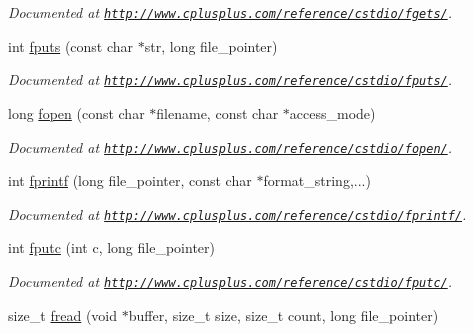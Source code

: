 \begin{DoxyCompactItemize}
\begin{DoxyCompactList}\small\item\em Documented at \href{http://www.cplusplus.com/reference/cstdio/fgets/}{\tt http\-://www.\-cplusplus.\-com/reference/cstdio/fgets/}. \end{DoxyCompactList}\item 
\hypertarget{group__file_gaf7529a4ebfea114f18c84860c6e9e04c}{int \hyperlink{group__file_gaf7529a4ebfea114f18c84860c6e9e04c}{fputs} (const char $\ast$str, long file\-\_\-pointer)}\label{group__file_gaf7529a4ebfea114f18c84860c6e9e04c}

\begin{DoxyCompactList}\small\item\em Documented at \href{http://www.cplusplus.com/reference/cstdio/fputs/}{\tt http\-://www.\-cplusplus.\-com/reference/cstdio/fputs/}. \end{DoxyCompactList}\item 
\hypertarget{group__file_gacb39e7f103a086acfd6add72c1b362c0}{long \hyperlink{group__file_gacb39e7f103a086acfd6add72c1b362c0}{fopen} (const char $\ast$filename, const char $\ast$access\-\_\-mode)}\label{group__file_gacb39e7f103a086acfd6add72c1b362c0}

\begin{DoxyCompactList}\small\item\em Documented at \href{http://www.cplusplus.com/reference/cstdio/fopen/}{\tt http\-://www.\-cplusplus.\-com/reference/cstdio/fopen/}. \end{DoxyCompactList}\item 
\hypertarget{group__file_gaee12141810555c53258443f8ff929b1f}{int \hyperlink{group__file_gaee12141810555c53258443f8ff929b1f}{fprintf} (long file\-\_\-pointer, const char $\ast$format\-\_\-string,...)}\label{group__file_gaee12141810555c53258443f8ff929b1f}

\begin{DoxyCompactList}\small\item\em Documented at \href{http://www.cplusplus.com/reference/cstdio/fprintf/}{\tt http\-://www.\-cplusplus.\-com/reference/cstdio/fprintf/}. \end{DoxyCompactList}\item 
\hypertarget{group__file_ga78f482be08e44554b059b574c4b63d0d}{int \hyperlink{group__file_ga78f482be08e44554b059b574c4b63d0d}{fputc} (int c, long file\-\_\-pointer)}\label{group__file_ga78f482be08e44554b059b574c4b63d0d}

\begin{DoxyCompactList}\small\item\em Documented at \href{http://www.cplusplus.com/reference/cstdio/fputc/}{\tt http\-://www.\-cplusplus.\-com/reference/cstdio/fputc/}. \end{DoxyCompactList}\item 
\hypertarget{group__file_ga3b86a6bb8423253b0089888caafb13b8}{size\-\_\-t \hyperlink{group__file_ga3b86a6bb8423253b0089888caafb13b8}{fread} (void $\ast$buffer, size\-\_\-t size, size\-\_\-t count, long file\-\_\-pointer)}\label{group__file_ga3b86a6bb8423253b0089888caafb13b8}


\end{DoxyCompactItemize}
